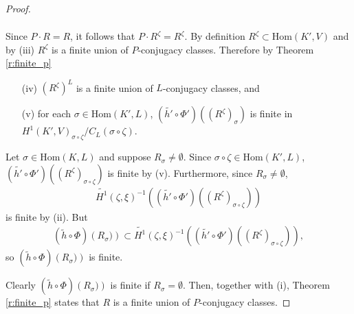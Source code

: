 \begin{proof}
{\begin{align*}
{		}
	\end{align*}
	}%
\par
Since $P \cdot R = R$, it follows that $P\cdot R^\zeta = R^\zeta$. By definition $R^\zeta \subset \mathrm{Hom}(K', V)$ and by (iii) $R^\zeta$ is a finite union of $P$-conjugacy classes. Therefore by Theorem \ref{r:finite_p}
\begin{itemize}
	\item[(iv)] $\left(R^\zeta\right)^L$ is a finite union of $L$-conjugacy classes, and
	\item[(v)] for each $\sigma \in \mathrm{Hom}(K', L)$, $(\widetilde{h'} \circ \Phi')\left(\left(R^\zeta\right)_\sigma\right)$ is finite in $H^1(K', V)_{\sigma\circ\zeta}/C_L(\sigma\circ\zeta)$.
\end{itemize}

Let $\sigma \in \mathrm{Hom}(K, L)$ and suppose $R_\sigma \neq \emptyset$. Since $\sigma\circ\zeta \in \mathrm{Hom}(K', L)$, $(\widetilde{h'} \circ \Phi')\left((R^\zeta)_{\sigma\circ\zeta}\right)$ is finite by (v). Furthermore, since $R_\sigma \neq \emptyset$,
\begin{align*}
\widetilde{H^1}(\zeta, \xi)^{-1}\left((\widetilde{h'} \circ \Phi')\left((R^\zeta)_{\sigma\circ\zeta}\right)\right)
\end{align*}
is finite by (ii). But 
\begin{align*}
(\widetilde{h} \circ \Phi)\left(R_\sigma)\right) \subset \widetilde{H^1}(\zeta, \xi)^{-1}\left((\widetilde{h'} \circ \Phi')\left((R^\zeta)_{\sigma\circ\zeta}\right)\right),
\end{align*}
so $(\widetilde{h} \circ \Phi)\left(R_\sigma)\right)$ is finite.

Clearly $(\widetilde{h} \circ \Phi)\left(R_\sigma)\right)$ is finite if $R_\sigma = \emptyset$. Then, together with (i), Theorem \ref{r:finite_p} states that $R$ is a finite union of $P$-conjugacy classes.
\end{proof}

